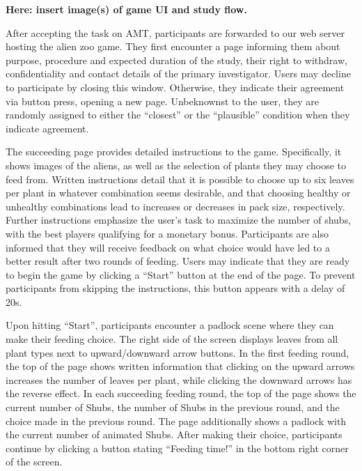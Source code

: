 {\textbf{Here: insert image(s) of game UI and study flow.}

After accepting the task on \gls{AMT}, participants are forwarded to our web server hosting the alien zoo game.
They first encounter a page informing them about purpose, procedure and expected duration of the study, their right to withdraw, confidentiality and contact details of the primary investigator.
Users may decline to participate by closing this window.
Otherwise, they indicate their agreement via button press, opening a new page.
Unbeknownst to the user, they are randomly assigned to either the ``closest'' or the ``plausible'' condition when they indicate agreement.

The succeeding page provides detailed instructions to the game. 
Specifically, it shows images of the aliens, as well as the selection of plants they may choose to feed from.
Written instructions detail that it is possible to choose up to six leaves per plant in whatever combination seems desirable, and that choosing healthy or unhealthy combinations lead to increases or decreases in pack size, respectively.
Further instructions emphasize the user's task to maximize the number of shubs, with the best players qualifying for a monetary bonus.
Participants are also informed that they will receive feedback on what choice would have led to a better result after two rounds of feeding.
Users may indicate that they are ready to begin the game by clicking a ``Start'' button at the end of the page.
To prevent participants from skipping the instructions, this button appears with a delay of 20s.

Upon hitting ``Start'', participants encounter a padlock scene where they can make their feeding choice.
The right side of the screen displays leaves from all plant types next to upward/downward arrow buttons. 
In the first feeding round, the top of the page shows written information that clicking on the upward arrows increases the number of leaves per plant, while clicking the downward arrows has the reverse effect.
In each succeeding feeding round, the top of the page shows the current number of Shubs, the number of Shubs in the previous round, and the choice made in the previous round.
The page additionally shows a padlock with the current number of animated Shubs.
After making their choice, participants continue by clicking a button stating ``Feeding time!'' in the bottom right corner of the screen.

}
